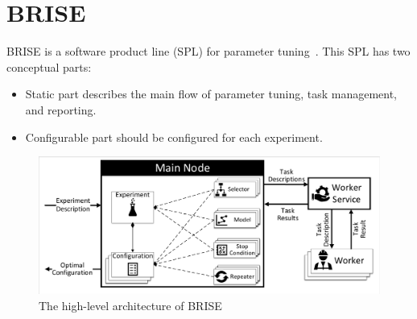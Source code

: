 \section{BRISE}
BRISE is a software product line (SPL) for parameter tuning~\cite{pukhkaiev19}.
This SPL has two conceptual parts:
\begin{itemize}
	\item Static part describes the main flow of parameter tuning, task management, and reporting.
	\item Configurable part should be configured for each experiment.
\end{itemize}

\begin{figure}
	\centering
	\includegraphics[width=\textwidth]{images/BRISEarch.pdf}
	\caption[The high-level architecture of BRISE]{The high-level architecture of BRISE}
	\label{fig:BRISEarch}
\end{figure}

